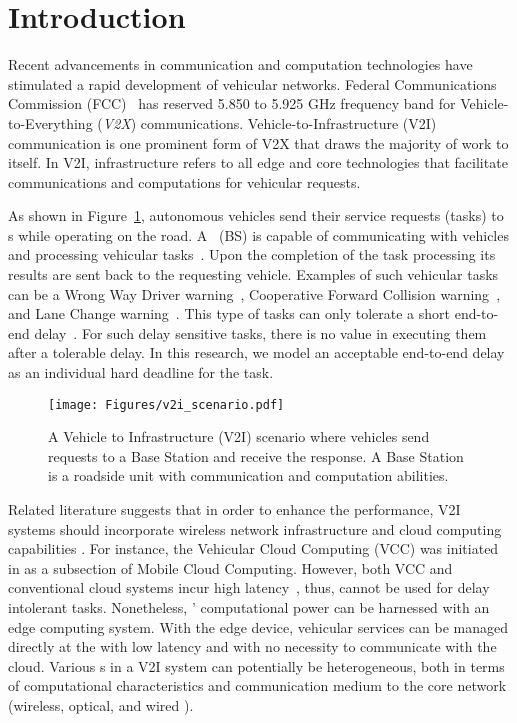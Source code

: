 
\section{Introduction}\label{sec:intro}
Recent advancements in communication and computation technologies have stimulated a rapid development of vehicular networks. Federal Communications Commission (FCC)~\cite{ali2011co} has reserved 5.850 to 5.925 GHz frequency band for Vehicle-to-Everything (\emph{V2X}) communications. Vehicle-to-Infrastructure (V2I) communication is one prominent form of V2X that draws the majority of work to itself. In V2I, infrastructure refers to all edge and core technologies that facilitate communications and computations for vehicular requests.

As shown in Figure~\ref{fig:scen}, autonomous vehicles send their service requests (tasks) to \bs s while operating on the road. A \bs~(BS) is capable of communicating with vehicles and processing vehicular tasks~\cite{bok2016multiple}. Upon the completion of the task processing its results are sent back to the requesting vehicle. Examples of such vehicular tasks can be a Wrong Way Driver warning~\cite{ABIresearch}, Cooperative Forward Collision warning~\cite{ElBatt}, and Lane Change warning~\cite{ABIresearch}. This type of tasks can only tolerate a short end-to-end delay~\cite{ali2011co}. For such delay sensitive tasks, there is no value in executing them after a tolerable delay. In this research, we model an acceptable end-to-end delay as an individual hard deadline for the task. 

\begin{figure}[h!]
\texttt{[image: Figures/v2i\_scenario.pdf]}
\caption{A Vehicle to Infrastructure (V2I) scenario where vehicles send requests to a Base Station and receive the response. A Base Station is a roadside unit with communication and computation abilities.\label{fig:scen}}
\end{figure}

Related literature suggests that in order to enhance the performance, V2I systems should incorporate wireless network infrastructure and cloud computing capabilities \cite{yu2016optimal}. For instance, the Vehicular Cloud Computing (VCC) was initiated in \cite{gerla2012} as a subsection of Mobile Cloud Computing. However, both VCC and conventional cloud systems incur high latency~\cite{li2017resource}, thus, cannot be used for delay intolerant tasks. Nonetheless, \bs' computational power can be harnessed with an edge computing system. With the edge device, vehicular services can be managed directly at the \bs with low latency and with no necessity to communicate with the cloud. Various \bs s in a V2I system can potentially be heterogeneous, both in terms of computational characteristics and communication medium to the core network (\eg wireless, optical, and wired \cite{bok2016multiple}). 

